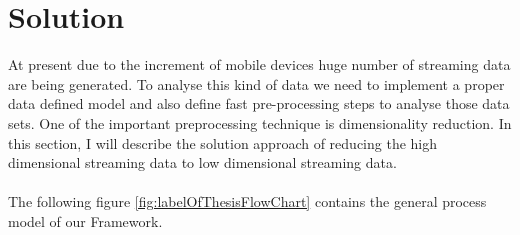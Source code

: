 \chapter{Solution}
\label{cha:solutioni}


At present due to the increment of mobile devices huge number of streaming data are being generated. To analyse this kind of data we need to implement a proper data defined model and also define fast pre-processing steps to analyse those data sets. One of the important preprocessing technique is dimensionality reduction. In this section, I will describe the solution approach of reducing the high dimensional streaming data to low dimensional streaming data.\\\\
The following figure \ref{fig:labelOfThesisFlowChart} contains the general process model of our Framework.
